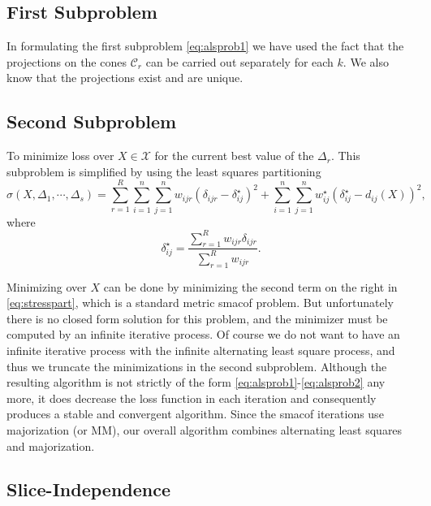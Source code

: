 \documentclass[
  12pt,
]{article}
\begin{document}
\subsection{First Subproblem}\label{first-subproblem}

In formulating the first subproblem \eqref{eq:alsprob1} we have used the fact that the projections on the cones \(\mathcal{C}_r\) can be carried out separately for each \(k\). We also know that the projections exist and are unique.

\subsection{Second Subproblem}\label{second-subproblem}

To minimize loss over \(X\in\mathcal{X}\) for the current best value of the \(\Delta_r\). This subproblem is simplified by using the least squares partitioning
\begin{equation}
\sigma(X,\Delta_1,\cdots,\Delta_s)=\sum_{r=1}^R\sum_{i=1}^n\sum_{j=1}^nw_{ijr}(\delta_{ijr}-\delta_{ij}^\star)^2+\sum_{i=1}^n\sum_{j=1}^nw_{ij}^\star(\delta_{ij}^\star-d_{ij}(X))^2,
\label{eq:stresspart}
\end{equation}
where
\begin{equation}
\delta_{ij}^\star=\frac{\sum_{r=1}^R w_{ijr}\delta_{ijr}}{\sum_{r=1}^R w_{ijr}}.
\label{eq:deltastardef}
\end{equation}

Minimizing over \(X\) can be done by minimizing the second term on the right in
\eqref{eq:stresspart}, which is a standard metric smacof problem. But unfortunately there is no closed form solution for this problem, and the
minimizer must be computed by an infinite iterative process. Of course
we do not want to have an infinite iterative process with the infinite alternating least square process, and thus we truncate the minimizations
in the second subproblem. Although the resulting algorithm is not
strictly of the form \eqref{eq:alsprob1}-\eqref{eq:alsprob2} any more, it does
decrease the loss function in each iteration and consequently
produces a stable and convergent algorithm. Since the smacof iterations
use majorization (or MM), our overall algorithm combines alternating
least squares and majorization.

\subsection{Slice-Independence}\label{slice-independence}
\end{document}
